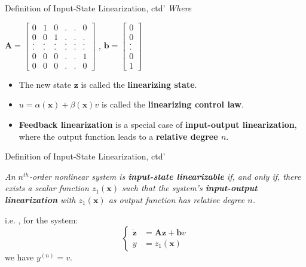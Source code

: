 \documentclass{beamer}
\renewcommand{\vec}[1]{\ensuremath{\boldsymbol{#1}}} %
\begin{document}
\begin{frame}{Definition of Input-State Linearization, ctd'}
    \textit{Where}
    \begin{center}
    $\vec{A}=\left[\begin{matrix}
                    0 & 1 & 0 & . & . & 0 \\
                    0 & 0 & 1 & . & . & . \\
                    . & . & . & . & . & . \\
                    . & . & . & . & . & . \\
                    0 & 0 & 0 & . & . & 1 \\
                    0 & 0 & 0 & . & . & 0
                  \end{matrix}\right]$ , \quad
    $\vec{b}=\left[\begin{matrix}
                       0 \\
                       0 \\
                       . \\
                       . \\
                       0 \\
                       1
                     \end{matrix}\right]$
    \end{center}
    \begin{itemize}
      \item The new state \vec{z} is called the \textbf{linearizing state}.
      \item $u = \alpha(\vec{x})+\beta(\vec{x})v$ is called the \textbf{linearizing control law}.
      \item \textbf{Feedback linearization} is a {\color{red}special case} of \textbf{input-output linearization}, where the output function leads to a \textbf{relative degree $n$}.
    \end{itemize}
\end{frame}


\begin{frame}{Definition of Input-State Linearization, ctd'}
    \begin{lemma}[6.3]
    \textit{
    An $n^{th}$-order nonlinear system is \textbf{input-state linearizable} if, and only if, there exists a scalar function $z_{1}(\vec{x})$ such that the system's \textbf{input-output linearization} with $z_{1}(\vec{x})$ as output function has relative degree $n$.}
    \end{lemma}

    i.e. , for the system:
    \begin{equation}\label{relation-equation}\nonumber
      \left\{\begin{aligned}
               \dot{\vec{z}} &= \vec{A}\vec{z}+\vec{b}v \\
               y &= z_{1}(\vec{x})
             \end{aligned}\right.
    \end{equation}
    we have {\color{red}$y^{(n)} = v$}.
\end{frame}
\end{document}
